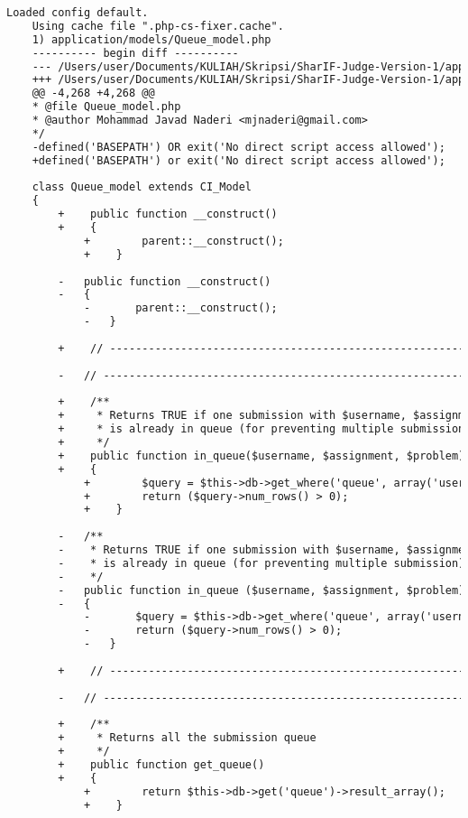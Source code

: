 \begin{lstlisting}[language=diff, caption=Perubahan pada kode Queue\_model.php]
	Loaded config default.
	Using cache file ".php-cs-fixer.cache".
	1) application/models/Queue_model.php
	---------- begin diff ----------
	--- /Users/user/Documents/KULIAH/Skripsi/SharIF-Judge-Version-1/application/models/Queue_model.php
	+++ /Users/user/Documents/KULIAH/Skripsi/SharIF-Judge-Version-1/application/models/Queue_model.php
	@@ -4,268 +4,268 @@
	* @file Queue_model.php
	* @author Mohammad Javad Naderi <mjnaderi@gmail.com>
	*/
	-defined('BASEPATH') OR exit('No direct script access allowed');
	+defined('BASEPATH') or exit('No direct script access allowed');
	
	class Queue_model extends CI_Model
	{
		+    public function __construct()
		+    {
			+        parent::__construct();
			+    }
		
		-	public function __construct()
		-	{
			-		parent::__construct();
			-	}
		
		+    // ------------------------------------------------------------------------
		
		-	// ------------------------------------------------------------------------
		
		+    /**
		+     * Returns TRUE if one submission with $username, $assignment and $problem
		+     * is already in queue (for preventing multiple submission)
		+     */
		+    public function in_queue($username, $assignment, $problem)
		+    {
			+        $query = $this->db->get_where('queue', array('username' => $username, 'assignment' => $assignment, 'problem' => $problem));
			+        return ($query->num_rows() > 0);
			+    }
		
		-	/**
		-	 * Returns TRUE if one submission with $username, $assignment and $problem
		-	 * is already in queue (for preventing multiple submission)
		-	 */
		-	public function in_queue ($username, $assignment, $problem)
		-	{
			-		$query = $this->db->get_where('queue', array('username'=>$username, 'assignment'=>$assignment, 'problem'=>$problem));
			-		return ($query->num_rows() > 0);
			-	}
		
		+    // ------------------------------------------------------------------------
		
		-	// ------------------------------------------------------------------------
		
		+    /**
		+     * Returns all the submission queue
		+     */
		+    public function get_queue()
		+    {
			+        return $this->db->get('queue')->result_array();
			+    }
		

\end{lstlisting}

